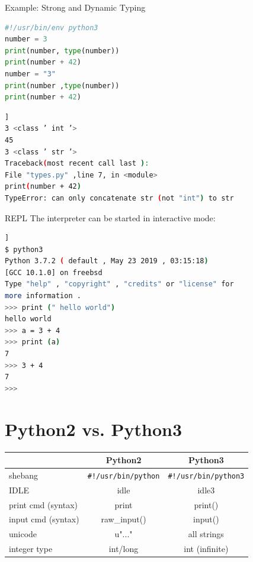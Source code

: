 \documentclass[xcolor=dvipsnames,aspectratio=169]{beamer}
\begin{document}
\begin{frame}[fragile]{Example: Strong and Dynamic Typing}
\begin{lstlisting}[language=Python]
#!/usr/bin/env python3
number = 3
print(number, type(number))
print(number + 42)
number = "3"
print(number ,type(number))
print(number + 42)
\end{lstlisting}

\begin{lstlisting}[language=Bash ,backgroundcolor=\color{green!20}]]
3 <class ’ int ’>
45
3 <class ’ str ’>
Traceback(most recent call last ):
File "types.py" ,line 7, in <module>
print(number + 42)
TypeError: can only concatenate str (not "int") to str
\end{lstlisting}
\end{frame}

\begin{frame}[fragile]{REPL}
The interpreter can be started in interactive mode:
\begin{lstlisting}[language=Bash ,backgroundcolor=\color{green!20}]]
$ python3
Python 3.7.2 ( default , May 23 2019 , 03:15:18)
[GCC 10.1.0] on freebsd
Type "help" , "copyright" , "credits" or "license" for
more information .
>>> print (" hello world")
hello world
>>> a = 3 + 4
>>> print (a)
7
>>> 3 + 4
7
>>>
\end{lstlisting}
\end{frame}

\section{Python2 vs. Python3}
\begin{frame}
\begin{table}
\centering
\begin{tabular}{|l|c|c|} \hline
& \textbf{Python2} & \textbf{Python3} \\ \hline
shebang & \texttt{\#!/usr/bin/python} & \texttt{\#!/usr/bin/python3} \\ \hline
IDLE & idle & idle3 \\ \hline
print cmd (syntax) & print & print() \\ \hline
input cmd (syntax) & raw\_input() & input() \\ \hline
unicode & u"..." & all strings \\ \hline
integer type & int/long & int (infinite) \\ \hline
\end{tabular}
\end{table}
\end{frame}
\end{document}
